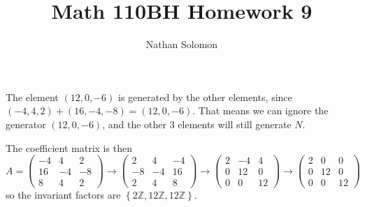 \documentclass[12pt]{article}
\begin{document}
\title{Math 110BH Homework 9}
\author{Nathan Solomon}
\maketitle

\section{}
\noindent{}\bigskip\par
The element $(12,0,-6)$ is generated by the other elements, since $(-4,4,2)+(16,-4,-8)=(12,0,-6)$. That means we can ignore the generator $(12,0,-6)$, and the other 3 elements will still generate $N$.
\par
The coefficient matrix is then
\[ A = \begin{pmatrix}
    -4 & 4 & 2 \\
    16 & -4 & -8 \\
    8 & 4 & 2
\end{pmatrix} \rightarrow \begin{pmatrix}
    2 & 4 & -4 \\
    -8 & -4 & 16 \\
    2 & 4 & 8
\end{pmatrix} \rightarrow \begin{pmatrix}
    2 & -4 & 4 \\
    0 & 12 & 0 \\
    0 & 0 & 12
\end{pmatrix} \rightarrow \begin{pmatrix}
    2 & 0 & 0 \\
    0 & 12 & 0 \\
    0 & 0 & 12
\end{pmatrix} \]
so the invariant factors are $ \left\{ 2\mathbb{Z}, 12\mathbb{Z}, 12\mathbb{Z} \right\}$.
\end{document}
